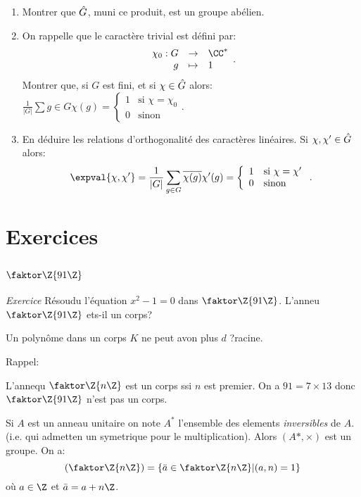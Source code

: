 \begin{enumerate}
	\item Montrer que $\Hat G$, muni ce produit, est un groupe abélien.
	\item On rappelle que le caractère trivial est défini par: $$\begin{array}{rcl}\chi_0:G &\rightarrow& \CC^\ast\\ g&\mapsto& 1\end{array}.$$
	Montrer que, si $G$ est fini, et si $\chi \in\Hat G$ alors:
	$\frac 1{|G|}\sum g\in G\chi(g)=\left\{\begin{array}{cl} 1 & \text{si $\chi=\chi_0$} \\ 0 & \text{sinon}\end{array}\right. $.
	\item En déduire les relations d'orthogonalité des caractères linéaires. Si $\chi,\chi'\in\Hat G$ alors:
	$$\expval{\chi,\chi'}=\frac 1{|G|}\sum_{g\in G}\overline{\chi(g)}\chi'(g)=\left\{ \begin{array}{cl}1&\text{si $\chi=\chi'$}\\0&\text{sinon}\end{array}\right..$$
\end{enumerate}


\chapter{Exercices}

\section{$\faktor\Z{91\Z}$}

\emph{Exercice}
Résoudu l'équation $x^2-1=0$ dans $\faktor\Z{91\Z}$. L'anneu $\faktor\Z{91\Z}$ ets-il un corps?
\begin{remark}
	Un polynôme dans un corps $K$ ne peut avon plus $d$ ?racine.
\end{remark}

Rappel:

L'annequ $\faktor\Z{n\Z}$ est un corps ssi $n$ est premier. On a $91=7\times 13$ donc $\faktor\Z{91\Z}$ n'est pas un corps.

Si $A$ est un anneau unitaire on note $A^{\ast}$ l'ensemble des elements \emph{inversibles} de $A$. (i.e. qui admetten un symetrique pour le multiplication). Alors $(A\ast,\times)$ est un groupe. On a:
$$(\faktor\Z{n\Z})=\{\bar a\in \faktor\Z{n\Z}|(a,n)=1\}$$ où $a\in\Z$ et $\bar a=a+n\Z$.

